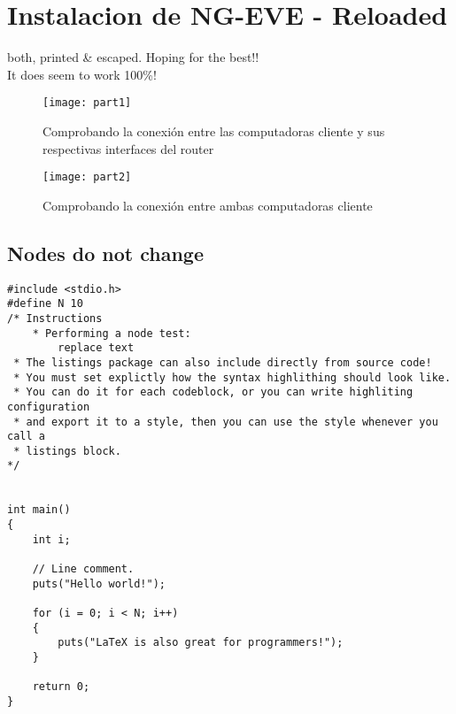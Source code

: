 \documentclass{article} %
\author{\nombre , \carnet}
\title{\titulo}
\begin{document}
\maketitle

\section{Instalacion de NG-EVE - Reloaded}
	both, printed & escaped. Hoping for the best!!\\It does seem to work 100\%!
	\blindtext
	\begin{figure}[h]
		\texttt{[image: part1]}
		 \caption{Comprobando la conexión entre las computadoras cliente y sus respectivas interfaces del router}
	    \label{fig:conn1}
	\end{figure}
	\begin{figure}[h]
		\texttt{[image: part2]}
		\caption{Comprobando la conexión entre ambas computadoras cliente}
	\end{figure}
	\FloatBarrier %
		\subsection{Nodes do not change}
			\blindtext
			\begin{lstlisting}
#include <stdio.h>
#define N 10
/* Instructions 
	* Performing a node test: 
		replace text
 * The listings package can also include directly from source code!
 * You must set explictly how the syntax highlithing should look like.
 * You can do it for each codeblock, or you can write highliting configuration 
 * and export it to a style, then you can use the style whenever you call a 
 * listings block.
*/


int main()
{
    int i;

    // Line comment.
    puts("Hello world!");

    for (i = 0; i < N; i++)
    {
        puts("LaTeX is also great for programmers!");
    }

    return 0;
}
		\end{lstlisting} 
\end{document}
